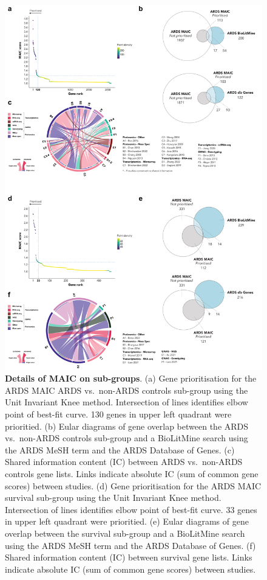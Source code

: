 \documentclass[
  11,
  a4paper,
]{article}
\begin{document}
\begin{figure}

{\centering \includegraphics{../img/Supplementary_Figure_7.png}

}

\caption{\textbf{Details of MAIC on sub-groups}. (a) Gene prioritisation
for the ARDS MAIC ARDS vs.~non-ARDS controls sub-group using the Unit
Invariant Knee method. Intersection of lines identifies elbow point of
best-fit curve. 130 genes in upper left quadrant were prioritied. (b)
Eular diagrams of gene overlap between the ARDS vs.~non-ARDS controls
sub-group and a BioLitMine search using the ARDS MeSH term and the ARDS
Database of Genes. (c) Shared information content (IC) between ARDS
vs.~non-ARDS controls gene lists. Links indicate absolute IC (sum of
common gene scores) between studies. (d) Gene prioritisation for the
ARDS MAIC survival sub-group using the Unit Invariant Knee method.
Intersection of lines identifies elbow point of best-fit curve. 33 genes
in upper left quadrant were prioritied. (e) Eular diagrams of gene
overlap between the survival sub-group and a BioLitMine search using the
ARDS MeSH term and the ARDS Database of Genes. (f) Shared information
content (IC) between survival gene lists. Links indicate absolute IC
(sum of common gene scores) between studies.}

\end{figure}
\end{document}

